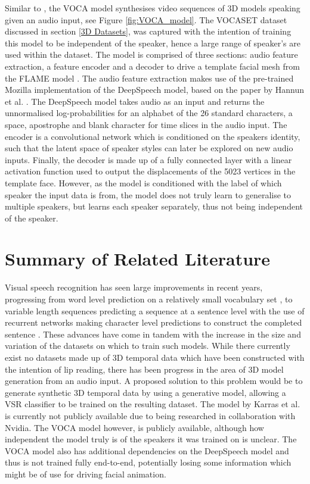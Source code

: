 Similar to \cite{Tzirakis2019}, the VOCA model \cite{Cudeiro2019} synthesises video sequences of 3D models speaking given an audio input, see Figure \ref{fig:VOCA_model}.
The VOCASET dataset discussed in section \ref{3D Datasets}, was captured with the intention of training this model to be independent of the speaker, hence a large range of speaker's are used within the dataset.
The model is comprised of three sections: audio feature extraction, a feature encoder and a decoder to drive a template facial mesh from the FLAME model \cite{Li2017}.
The audio feature extraction makes use of the pre-trained Mozilla implementation of the DeepSpeech model, based on the paper by Hannun et al. \cite{Hannun2014}.
The DeepSpeech model takes audio as an input and returns the unnormalised log-probabilities for an alphabet of the 26 standard characters, a space, apostrophe and blank character for time slices in the audio input.
The encoder is a convolutional network which is conditioned on the speakers identity, such that the latent space of speaker styles can later be explored on new audio inputs.
Finally, the decoder is made up of a fully connected layer with a linear activation function used to output the displacements of the 5023 vertices in the template face.
However, as the model is conditioned with the label of which speaker the input data is from, the model does not truly learn to generalise to multiple speakers, but learns each speaker separately, thus not being independent of the speaker.

\section{Summary of Related Literature}
Visual speech recognition has seen large improvements in recent years, progressing from word level prediction on a relatively small vocabulary set \cite{Chung2016}, to variable length sequences predicting a sequence at a sentence level with the use of recurrent networks making character level predictions to construct the completed sentence \cite{Shillingford2018}.
These advances have come in tandem with the increase in the size and variation of the datasets on which to train such models.
While there currently exist no datasets made up of 3D temporal data which have been constructed with the intention of lip reading, there has been progress in the area of 3D model generation from an audio input.
A proposed solution to this problem would be to generate synthetic 3D temporal data by using a generative model, allowing a VSR classifier to be trained on the resulting dataset.
The model by Karras et al. is currently not publicly available due to being researched in collaboration with Nvidia.
The VOCA model however, is publicly available, although how independent the model truly is of the speakers it was trained on is unclear.
The VOCA model also has additional dependencies on the DeepSpeech model and thus is not trained fully end-to-end, potentially losing some information which might be of use for driving facial animation.

%
%
%
